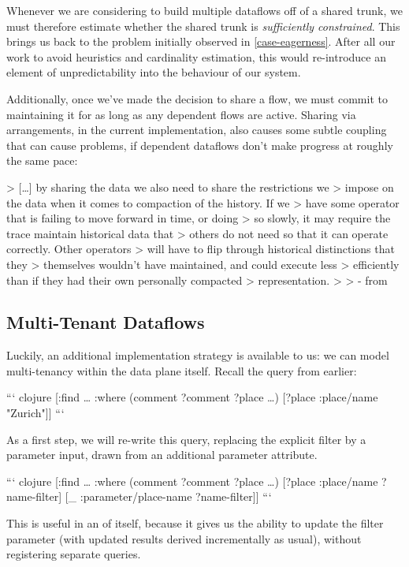 \documentclass[../catalog.tex]{subfiles}
\begin{document}
Whenever we are considering to build multiple dataflows off of a
shared trunk, we must therefore estimate whether the shared trunk is
\emph{sufficiently constrained}. This brings us back to the problem
initially observed in \ref{case-eagerness}. After all our work to
avoid heuristics and cardinality estimation, this would re-introduce
an element of unpredictability into the behaviour of our system.

Additionally, once we've made the decision to share a flow, we must
commit to maintaining it for as long as any dependent flows are
active. Sharing via arrangements, in the current implementation, also
causes some subtle coupling that can cause problems, if dependent
dataflows don't make progress at roughly the same pace:

> [\ldots{}] by sharing the data we also need to share the restrictions we
> impose on the data when it comes to compaction of the history. If we
> have some operator that is failing to move forward in time, or doing
> so slowly, it may require the trace maintain historical data that
> others do not need so that it can operate correctly. Other operators
> will have to flip through historical distinctions that they
> themselves wouldn't have maintained, and could execute less
> efficiently than if they had their own personally compacted
> representation.
> 
> - from \cite{makingarrangements}

\subsection{Multi-Tenant Dataflows}

Luckily, an additional implementation strategy is available to us: we
can model multi-tenancy within the data plane itself. Recall the query
from earlier:

``` clojure
[:find \ldots{}
 :where
 (comment ?comment ?place \ldots{})
 [?place :place/name "Zurich"]]
```

As a first step, we will re-write this query, replacing the explicit
filter by a parameter input, drawn from an additional parameter
attribute.

``` clojure
[:find \ldots{}
 :where
 (comment ?comment ?place \ldots{})
 [?place :place/name ?name-filter]
 [\_ :parameter/place-name ?name-filter]]
```

This is useful in an of itself, because it gives us the ability to
update the filter parameter (with updated results derived
incrementally as usual), without registering separate queries.
\end{document}
